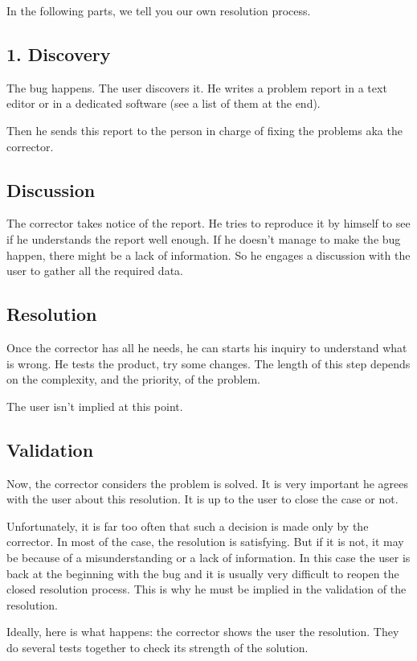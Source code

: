 In the following parts, we tell you our own resolution process.

\subsection{1. Discovery}
The bug happens. The user discovers it. He writes a problem report in a text editor or in a dedicated software (see a list of them at the end).

Then he sends this report to the person in charge of fixing the problems aka the corrector.

\subsection{Discussion}
The corrector takes notice of the report. He tries to reproduce it by himself to see if he understands the report well enough. If he doesn’t manage to make the bug happen, there might be a lack of information. So he engages a discussion with the user to gather all the required data.

\subsection{Resolution}
Once the corrector has all he needs, he can starts his inquiry to understand what is wrong. He tests the product, try some changes. The length of this step depends on the complexity, and the priority, of the problem.

The user isn’t implied at this point.

\subsection{Validation}
Now, the corrector considers the problem is solved. It is very important he agrees with the user about this resolution. It is up to the user to close the case or not.

Unfortunately, it is far too often that such a decision is made only by the corrector. In most of the case, the resolution is satisfying. But if it is not, it may be because of a misunderstanding or a lack of information. In this case the user is back at the beginning with the bug and it is usually very difficult to reopen the closed resolution process. This is why he must be implied in the validation of the resolution.

Ideally, here is what happens: the corrector shows the user the resolution. They do several tests together to check its strength of the solution.

